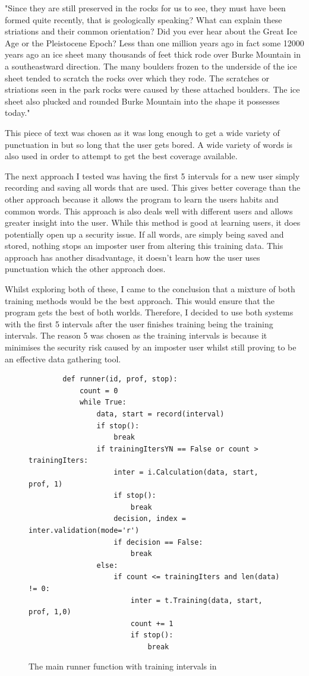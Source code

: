 \documentclass[10pt,a4paper]{report}
\begin{document}
"Since they are still preserved in the rocks for us to see, they must have been formed quite recently, that is geologically speaking?
What can explain these striations and their common orientation?			
Did you ever hear about the Great Ice Age or the Pleistocene Epoch?			
Less than one million years ago	in fact	some 12000 years ago an ice sheet many thousands of feet thick rode over Burke Mountain in a southeastward direction.
The many boulders frozen to the underside of the ice sheet tended to scratch the rocks over which they rode.			
The scratches or striations seen in the park rocks were caused by these attached boulders.				
The ice sheet also plucked and rounded Burke Mountain into the shape it possesses today."

This piece of text was chosen as it was long enough to get a wide variety of punctuation in but so long that the user gets bored. A wide variety of words is also used in order to attempt to get the best coverage available.

The next approach I tested was having the first 5 intervals for a new user simply recording and saving all words that are used. This gives better coverage than the other approach because it allows the program to learn the users habits and common words. This approach is also deals well with different users and allows greater insight into the user. While this method is good at learning users, it does potentially open up a security issue. If all words, are simply being saved and stored, nothing stops an imposter user from altering this training data. This approach has another disadvantage, it doesn't learn how the user uses punctuation which the other approach does. 

Whilst exploring both of these, I came to the conclusion that a mixture of both training methods would be the best approach. This would ensure that the program gets the best of both worlds. Therefore, I decided to use both systems with the first 5 intervals after the user finishes training being the training intervals. The reason 5 was chosen as the training intervals is because it minimises the security risk caused by an imposter user whilst still proving to be an effective data gathering tool.

\begin{figure}
	\begin{lstlisting}
		def runner(id, prof, stop):
    		count = 0
    		while True:
        		data, start = record(interval)
        		if stop():
            		break
        		if trainingItersYN == False or count > trainingIters:
            		inter = i.Calculation(data, start, prof, 1)
            		if stop():
                		break
            		decision, index = inter.validation(mode='r')
           			if decision == False:
                		break
        		else:
           			if count <= trainingIters and len(data) != 0:
                		inter = t.Training(data, start, prof, 1,0)
                		count += 1
                		if stop():
                   			break
      \end{lstlisting}
      \caption{The main runner function with training intervals in}
      \label{fig:runner}
\end{figure}
\end{document}
